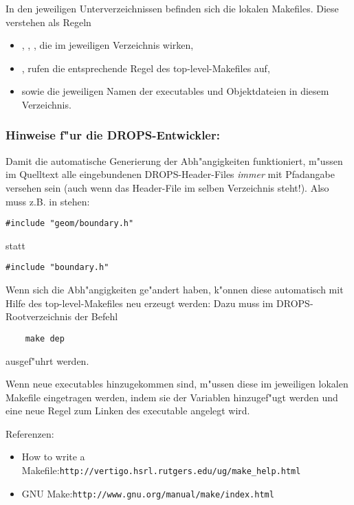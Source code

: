 In den jeweiligen Unterverzeichnissen befinden sich die lokalen Makefiles. 
Diese verstehen als Regeln 
\begin{itemize}
  \item {}, , , die im jeweiligen Verzeichnis wirken,
  \item {},  rufen die entsprechende Regel des top-level-Makefiles auf,
  \item sowie die jeweiligen Namen der executables und Objektdateien in diesem Verzeichnis.
\end{itemize}


\subsubsection{Hinweise f"ur die DROPS-Entwickler:}


Damit die automatische Generierung der Abh"angigkeiten funktioniert, m"ussen
im Quelltext alle eingebundenen DROPS-Header-Files \emph{immer} mit Pfadangabe 
versehen sein (auch wenn das Header-File im selben Verzeichnis steht!). 
Also muss z.B. in  stehen: 

\begin{Code} \begin{verbatim}
#include "geom/boundary.h"
\end{verbatim}
\end{Code}
statt    
\begin{Code}
\begin{verbatim}
#include "boundary.h"
\end{verbatim}
\end{Code}


Wenn sich die Abh"angigkeiten ge"andert haben, k"onnen diese automatisch 
mit Hilfe des top-level-Makefiles neu erzeugt werden: Dazu muss im 
DROPS-Rootverzeichnis der Befehl
\begin{Code} \begin{verbatim}
    make dep
\end{verbatim} \end{Code}
ausgef"uhrt werden.

Wenn neue executables hinzugekommen sind, m"ussen diese im jeweiligen lokalen
Makefile eingetragen werden, indem sie der Variablen  hinzugef"ugt werden
und eine neue Regel zum Linken des executable angelegt wird.

Referenzen:
\begin{itemize}
  \item How to write a Makefile:\qquad  \verb|http://vertigo.hsrl.rutgers.edu/ug/make_help.html|
  \item GNU Make:\qquad                 \verb|http://www.gnu.org/manual/make/index.html|
\end{itemize}

